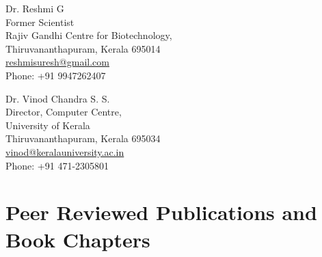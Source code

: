 \documentclass[a4paper, 10pt]{article}
\begin{document}
\begin{minipage}[ht]{.50\textwidth}
Dr. Reshmi G \\
Former Scientist \\
Rajiv Gandhi Centre for Biotechnology, \\
Thiruvananthapuram, Kerala 695014 \\
\href{mailto:reshmisuresh@gmail.com}{reshmisuresh@gmail.com} \\
Phone: +91 9947262407
\end{minipage}
\begin{minipage}[ht]{.50\textwidth}
Dr. Vinod Chandra S. S. \\
Director, Computer Centre, \\
University of Kerala \\
Thiruvananthapuram, Kerala 695034\\
\href{mailto:vinod@keralauniversity.ac.in}{vinod@keralauniversity.ac.in} \\
Phone: +91 471-2305801
\end{minipage} \newpage


\section*{Peer Reviewed Publications and Book Chapters}
\end{document}
